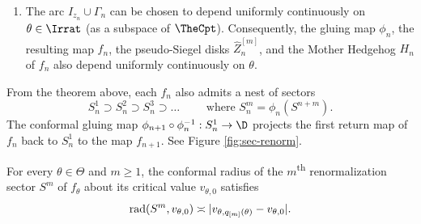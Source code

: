 \documentclass{amsart}
\begin{document}
\begin{theorem}
\begin{enumerate}
\begin{enumerate}[label=\textnormal{(\alph*)}]
        \item $\hat{Z}^{[-1]}_n$ and $\hat{Z}^{[0]}_n$ are $K$-quasidisks for some $\threshold$-uniform constant $K\geq 1$;
        \item there exist an $\threshold$-uniform constant $R$ and a universal constant $R'$ (independent of $\theta$, $n$, $m$) such that $0<R<R'<1$ and
            \[
            \D(0,R) \subset \hat{Z}^{[-1]}_n \subset \D(0,R').
            \]
    \end{enumerate}
    \item The arc $I_{z_n} \cup \Gamma_n$ can be chosen to depend uniformly continuously on $\theta \in \Irrat$ (as a subspace of $\TheCpt$). 
    Consequently, the gluing map $\phi_n$, the resulting map $f_n$, the pseudo-Siegel disks $\hat{Z}^{[m]}_n$, and the Mother Hedgehog $H_n$ of $f_n$ also depend uniformly continuously on $\theta$.
\end{enumerate}
\end{theorem}

From the theorem above, each $f_n$ also admits a nest of sectors 
\[
S_n^1 \supset S_n^2 \supset S_n^3 \supset \ldots
\qquad \text{ where }
S_n^m = \phi_n(S^{n+m}).
\]
The conformal gluing map $\phi_{n+1}\circ \phi_n^{-1} :S_n^1 \to \D$ projects the first return map of $f_n$ back to $S_n^1$ to the map $f_{n+1}$. See Figure \ref{fig:sec-renorm}.

\begin{lemma}
\label{lem:size-of-sectors}
    For every $\theta \in \Theta$ and $m \geq 1$, the conformal radius of the $m$\textsuperscript{th} renormalization sector $S^m$ of $f_\theta$ about its critical value $v_{\theta,0}$ satisfies
    \[
        \textnormal{rad}(S^m , v_{\theta,0}) \asymp |v_{\theta,q_{[m]}(\theta)}-v_{\theta,0}|.
    \]
\end{lemma}
\end{document}
